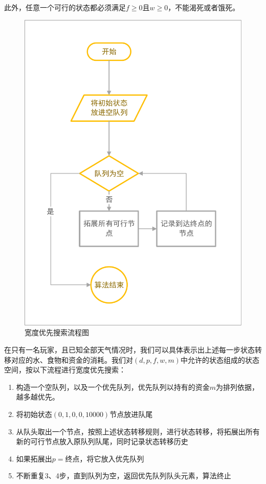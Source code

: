 \documentclass[withoutpreface,bwprint]{cumcmthesis} %
\begin{document}
此外，任意一个可行的状态都必须满足\(f\geq 0\)且\(w\geq 0\)，不能渴死或者饿死。

\begin{figure}[!htbp]
    \centering
    \includegraphics[height=.5\paperheight]{figures/bfs.pdf}
    \caption{宽度优先搜索流程图}
    \label{bfs}
\end{figure}

在只有一名玩家，且已知全部天气情况时，我们可以具体表示出上述每一步状态转移对应的水、食物和资金的消耗。我们对\((d,p,f,w,m)\)中允许的状态组成的状态空间，按以下流程进行宽度优先搜索：
\begin{enumerate}
    \item 构造一个空队列，以及一个优先队列，优先队列以持有的资金\(m\)为排列依据，越多越优先。
    \item 将初始状态\((0,1,0,0,10000)\)节点放进队尾
    \item 从队头取出一个节点，按照上述状态转移规则，进行状态转移，将拓展出所有新的可行节点放入原队列队尾，同时记录状态转移历史
    \item 如果拓展出\(p=\)终点，将它放入优先队列
    \item 不断重复3、4步，直到队列为空，返回优先队列队头元素，算法终止
\end{enumerate}
\end{document}
